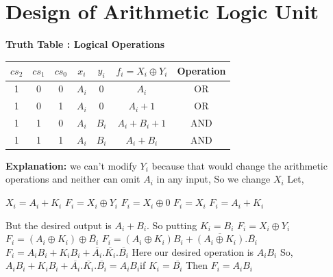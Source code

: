 \documentclass[]{article}
\begin{document}
	\section{Design of Arithmetic Logic Unit}
	\textbf{Truth Table : Logical Operations}
		\begin{center}
		\begin{tabular}{ |c|c|c|c|c|c|c| } 
			\hline
			$cs_2$ & $cs_1$ & $cs_0$ & $x_i$ & $y_i$ & $f_i=X_i \oplus Y_i$ & Operation \\
			\hline
			
			\hline
			1 & 0 & 0 & $A_i$ & $0$ & $A_i$ & OR \\
			\hline
			
			\hline
			1 & 0 & 1 & $A_i$ & $0$ & $A_i+1$ & OR \\
			\hline
			
			\hline
			1 & 1 & 0 & $A_i$ & $B_i$ & $A_i+B_i+1$ & AND \\
			\hline
			
			\hline
			1 & 1 & 1 & $A_i$ & $B_i$ & $A_i+B_i$ & AND\\
			\hline
		\end{tabular}
	\end{center}

	\textbf{Explanation:}\newline
	we can't modify $Y_i$ because that would change the arithmetic operations
	and neither can omit $A_i$ in any input, So we change $X_i$\newline
	Let,

	$X_i=A_i+K_i$ \newline
	$F_i=X_i \oplus Y_i$ \newline
	$F_i=X_i \oplus 0$ \newline
	$F_i=X_i$ \newline
	$F_i=A_i+K_i$\newline
	
	But the desired output is $A_i+B_i$. So putting $K_i=B_i$ \newline
	$F_i=X_i \oplus Y_i$\newline
	$F_i=(A_i \oplus K_i) \oplus \overline{B_i}$\newline
	$F_i=(A_i \oplus K_i)B_i + \overline{(A_i \oplus K_i)} .\overline{B_i}$\newline
	$F_i=A_iB_i + K_iB_i + \overline{A_i}.\overline{K_i}.\overline{B_i}$ \newline Here our desired operation is $A_iB_i$ \newline
	So, $A_iB_i + K_iB_i + \overline{A_i}.\overline{K_i}.\overline{B_i} = A_iB_i$\newline if $K_i=\overline{B_i}$	Then $F_i=A_iB_i$
	
	
\end{document}
